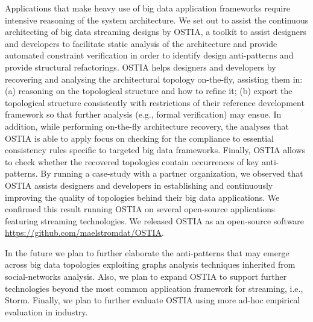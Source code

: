 Applications that make heavy use of big data application frameworks require intensive reasoning of the system architecture. We set out to assist the continuous architecting of big data streaming designs by OSTIA, a toolkit to assist designers and developers to facilitate static analysis of the architecture and provide automated constraint verification in order to identify design anti-patterns and provide structural refactorings. OSTIA helps designers and developers by recovering and analysing the architectural topology on-the-fly, assisting them in: (a) reasoning on the topological structure and how to refine it; (b) export the topological structure consistently with restrictions of their reference development framework so that further analysis (e.g., formal verification) may ensue. In addition, while performing on-the-fly architecture recovery, the analyses that OSTIA is able to apply focus on checking for the compliance to essential consistency rules specific to targeted big data frameworks. Finally, OSTIA allows to check whether the recovered topologies contain occurrences of key anti-patterns. By running a case-study with a partner organization, we observed that OSTIA assists designers and developers in establishing and continuously improving the quality of topologies behind their big data applications. We confirmed this result running OSTIA on several open-source applications featuring streaming technologies. We released OSTIA as an open-source software \url{https://github.com/maelstromdat/OSTIA}. 
 
In the future we plan to further elaborate the anti-patterns that may emerge across big data topologies exploiting graphs analysis techniques inherited from social-networks analysis. Also, we plan to expand OSTIA to support further technologies beyond the most common application framework for streaming, i.e., Storm. Finally, we plan to further evaluate OSTIA using more ad-hoc empirical evaluation in industry.